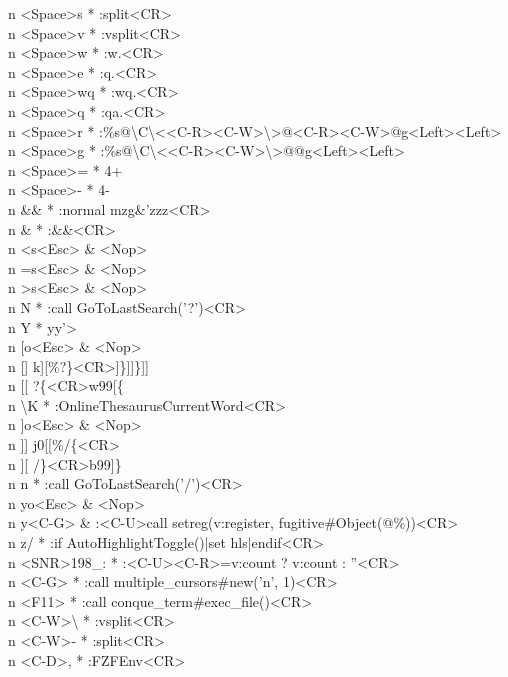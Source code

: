 \documentclass[11pt,a4paper,twoside]{book}
\begin{document}
n  <Space>s  * :split<CR>\\
n  <Space>v  * :vsplit<CR>\\
n  <Space>w  * :w.<CR>\\
n  <Space>e  * :q.<CR>\\
n  <Space>wq  * :wq.<CR>\\
n  <Space>q  * :qa.<CR>\\
n  <Space>r  * :\%s@\textbackslash{}C\textbackslash{}<<C-R><C-W>\textbackslash{}>@<C-R><C-W>@g<Left><Left>\\
n  <Space>g  * :\%s@\textbackslash{}C\textbackslash{}<<C-R><C-W>\textbackslash{}>@@g<Left><Left>\\
n  <Space>=  * 4+\\
n  <Space>-  * 4-\\
n  \&\&  * :normal mzg\&'zzz<CR>\\
n  \&  * :\&\&<CR>\\
n  <s<Esc>  \& <Nop>\\
n  =s<Esc>  \& <Nop>\\
n  >s<Esc>  \& <Nop>\\
n  N  * :call GoToLastSearch('?')<CR>\\
n  Y  * yy'>\\
n  [o<Esc>  \& <Nop>\\
n  []  k][\%?\}<CR>]\}]]\}]]\\
n  [[  ?\{<CR>w99[\{\\
n  \textbackslash{}K  * :OnlineThesaurusCurrentWord<CR>\\
n  ]o<Esc>  \& <Nop>\\
n  ]]  j0[[\%/\{<CR>\\
n  ][  /\}<CR>b99]\}\\
n  n  * :call GoToLastSearch('/')<CR>\\
n  yo<Esc>  \& <Nop>\\
n  y<C-G>  \& :<C-U>call setreg(v:register, fugitive\#Object(@\%))<CR>\\
n  z/  * :if AutoHighlightToggle()|set hls|endif<CR>\\
n  <SNR>198\_:  * :<C-U><C-R>=v:count ? v:count : ''<CR>\\
n  <C-G>  * :call multiple\_cursors\#new('n', 1)<CR>\\
n  <F11>  * :call conque\_term\#exec\_file()<CR>\\
n  <C-W>\textbackslash{}  * :vsplit<CR>\\
n  <C-W>-  * :split<CR>\\
n  <C-D>,  * :FZFEnv<CR>\\
\end{document}
